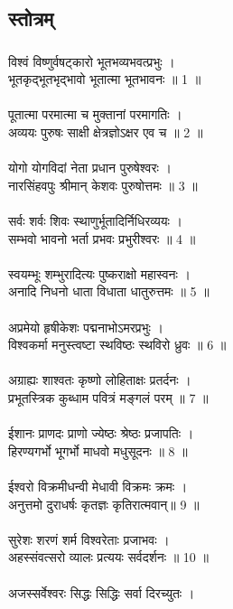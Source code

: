 \subsection{स्तोत्रम्}
\subsubsection{}
विश्वं विष्णुर्वषट्कारो भूतभव्यभवत्प्रभुः ।\\
भूतकृद्भूतभृद्भावो भूतात्मा भूतभावनः ॥ 1 ॥\\
\\
पूतात्मा परमात्मा च मुक्तानां परमागतिः ।\\
अव्ययः पुरुषः साक्षी क्षेत्रज्ञोऽक्षर एव च ॥ 2 ॥\\
\\
योगो योगविदां नेता प्रधान पुरुषेश्वरः ।\\
नारसिंहवपुः श्रीमान् केशवः पुरुषोत्तमः ॥ 3 ॥\\
\\
सर्वः शर्वः शिवः स्थाणुर्भूतादिर्निधिरव्ययः ।\\
सम्भवो भावनो भर्ता प्रभवः प्रभुरीश्वरः ॥ 4 ॥\\
\\
स्वयम्भूः शम्भुरादित्यः पुष्कराक्षो महास्वनः ।\\
अनादि निधनो धाता विधाता धातुरुत्तमः ॥ 5 ॥\\
\\
अप्रमेयो हृषीकेशः पद्मनाभोऽमरप्रभुः ।\\
विश्वकर्मा मनुस्त्वष्टा स्थविष्ठः स्थविरो ध्रुवः ॥ 6 ॥\\
\\
अग्राह्यः शाश्वतः कृष्णो लोहिताक्षः प्रतर्दनः ।\\
प्रभूतस्त्रिक कुब्धाम पवित्रं मङ्गलं परम् ॥ 7 ॥\\
\\
ईशानः प्राणदः प्राणो ज्येष्ठः श्रेष्ठः प्रजापतिः ।\\
हिरण्यगर्भो भूगर्भो माधवो मधुसूदनः ॥ 8 ॥\\
\\
ईश्वरो विक्रमीधन्वी मेधावी विक्रमः क्रमः ।\\
अनुत्तमो दुराधर्षः कृतज्ञः कृतिरात्मवान्॥ 9 ॥\\
\\
सुरेशः शरणं शर्म विश्वरेताः प्रजाभवः ।\\
अहस्संवत्सरो व्यालः प्रत्ययः सर्वदर्शनः ॥ 10 ॥\\
\\
अजस्सर्वेश्वरः सिद्धः सिद्धिः सर्वा दिरच्युतः ।\\
